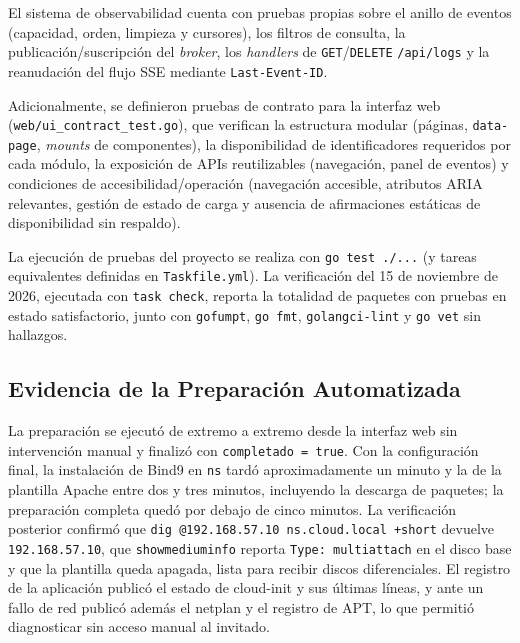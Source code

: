 El sistema de observabilidad cuenta con pruebas propias sobre el anillo de eventos (capacidad, orden, limpieza y cursores), los filtros de consulta, la publicación/suscripción del \textit{broker}, los \textit{handlers} de \texttt{GET}/\texttt{DELETE} \texttt{/api/logs} y la reanudación del flujo SSE mediante \texttt{Last-Event-ID}.

Adicionalmente, se definieron pruebas de contrato para la interfaz web (\texttt{web/ui\_contract\_test.go}), que verifican la estructura modular (páginas, \texttt{data-page}, \textit{mounts} de componentes), la disponibilidad de identificadores requeridos por cada módulo, la exposición de APIs reutilizables (navegación, panel de eventos) y condiciones de accesibilidad/operación (navegación accesible, atributos ARIA relevantes, gestión de estado de carga y ausencia de afirmaciones estáticas de disponibilidad sin respaldo).

La ejecución de pruebas del proyecto se realiza con \texttt{go test ./...} (y tareas equivalentes definidas en \texttt{Taskfile.yml}). La verificación del 15 de noviembre de 2026, ejecutada con \texttt{task check}, reporta la totalidad de paquetes con pruebas en estado satisfactorio, junto con \texttt{gofumpt}, \texttt{go fmt}, \texttt{golangci-lint} y \texttt{go vet} sin hallazgos.

\subsection{Evidencia de la Preparación Automatizada}
La preparación se ejecutó de extremo a extremo desde la interfaz web sin intervención manual y finalizó con \texttt{completado = true}. Con la configuración final, la instalación de Bind9 en \texttt{ns} tardó aproximadamente un minuto y la de la plantilla Apache entre dos y tres minutos, incluyendo la descarga de paquetes; la preparación completa quedó por debajo de cinco minutos. La verificación posterior confirmó que \texttt{dig @192.168.57.10 ns.cloud.local +short} devuelve \texttt{192.168.57.10}, que \texttt{showmediuminfo} reporta \texttt{Type: multiattach} en el disco base y que la plantilla queda apagada, lista para recibir discos diferenciales. El registro de la aplicación publicó el estado de cloud-init y sus últimas líneas, y ante un fallo de red publicó además el netplan y el registro de APT, lo que permitió diagnosticar sin acceso manual al invitado.

